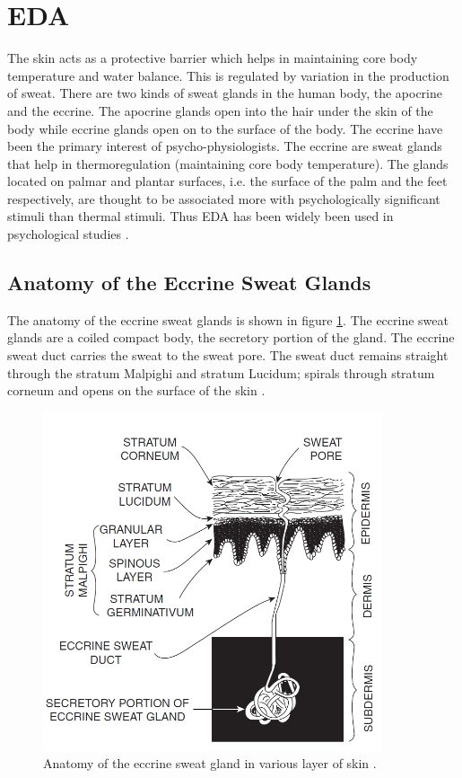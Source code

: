 \section{EDA}
The skin acts as a protective barrier which helps in maintaining core body temperature and water balance. This is regulated by variation in the production of sweat. There are two kinds of sweat glands in the human body, the apocrine and the eccrine. The apocrine glands open into the hair under the skin of the body while eccrine glands open on to the surface of the body. The eccrine have been the primary interest of psycho-physiologists. The eccrine are sweat glands that help in thermoregulation (maintaining core body temperature). The glands located on palmar and plantar surfaces, i.e. the surface of the palm and the feet respectively, are thought to be associated more with psychologically significant stimuli than thermal stimuli. Thus EDA has been widely been used in psychological studies \cite{cacioppo_electrodermal_2016_p_217_243}.

\subsection{Anatomy of the Eccrine Sweat Glands}
The anatomy of the eccrine sweat glands is shown in figure \ref{fig:eccrine_glands}. The eccrine sweat glands are a coiled compact body, the secretory portion of the gland. The eccrine sweat duct carries the sweat to the sweat pore. The sweat duct remains straight through the stratum Malpighi and stratum Lucidum; spirals through stratum corneum and opens on the surface of the skin \cite{cacioppo_electrodermal_2016_p_217_243}.
\begin{figure}
    \centering
    \includegraphics[width=100mm]{Figures/eccrine_glands.PNG}
    \caption{Anatomy of the eccrine sweat gland in various layer of skin \cite{hassett_primer_1978}.}
    \label{fig:eccrine_glands}
\end{figure}

